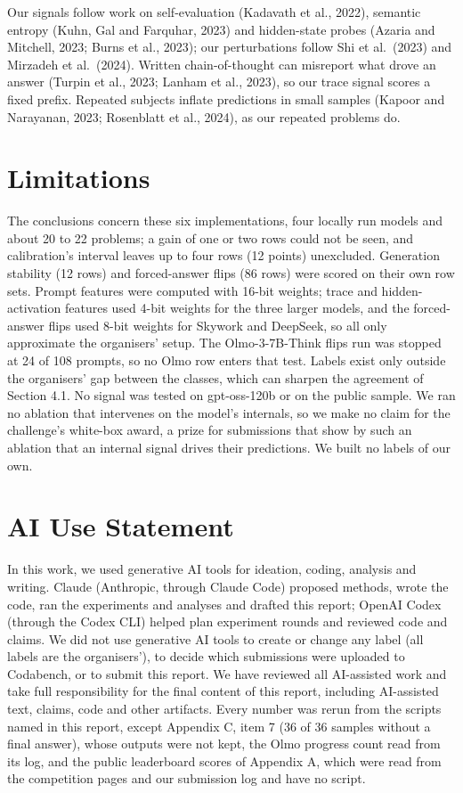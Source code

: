 \documentclass{article}
\begin{document}
Our signals follow work on self-evaluation (Kadavath et al., 2022), semantic entropy (Kuhn, Gal and Farquhar, 2023) and hidden-state probes (Azaria and Mitchell, 2023; Burns et al., 2023); our perturbations follow Shi et al.~(2023) and Mirzadeh et al.~(2024). Written chain-of-thought can misreport what drove an answer (Turpin et al., 2023; Lanham et al., 2023), so our trace signal scores a fixed prefix. Repeated subjects inflate predictions in small samples (Kapoor and Narayanan, 2023; Rosenblatt et al., 2024), as our repeated problems do.

\section*{Limitations}

The conclusions concern these six implementations, four locally run models and about 20 to 22 problems; a gain of one or two rows could not be seen, and calibration's interval leaves up to four rows (12 points) unexcluded. Generation stability (12 rows) and forced-answer flips (86 rows) were scored on their own row sets. Prompt features were computed with 16-bit weights; trace and hidden-activation features used 4-bit weights for the three larger models, and the forced-answer flips used 8-bit weights for Skywork and DeepSeek, so all only approximate the organisers' setup. The Olmo-3-7B-Think flips run was stopped at 24 of 108 prompts, so no Olmo row enters that test. Labels exist only outside the organisers' gap between the classes, which can sharpen the agreement of Section 4.1. No signal was tested on gpt-oss-120b or on the public sample. We ran no ablation that intervenes on the model's internals, so we make no claim for the challenge's white-box award, a prize for submissions that show by such an ablation that an internal signal drives their predictions. We built no labels of our own.

\section*{AI Use Statement}

In this work, we used generative AI tools for ideation, coding, analysis and writing. Claude (Anthropic, through Claude Code) proposed methods, wrote the code, ran the experiments and analyses and drafted this report; OpenAI Codex (through the Codex CLI) helped plan experiment rounds and reviewed code and claims. We did not use generative AI tools to create or change any label (all labels are the organisers'), to decide which submissions were uploaded to Codabench, or to submit this report. We have reviewed all AI-assisted work and take full responsibility for the final content of this report, including AI-assisted text, claims, code and other artifacts. Every number was rerun from the scripts named in this report, except Appendix C, item 7 (36 of 36 samples without a final answer), whose outputs were not kept, the Olmo progress count read from its log, and the public leaderboard scores of Appendix A, which were read from the competition pages and our submission log and have no script.
\end{document}

